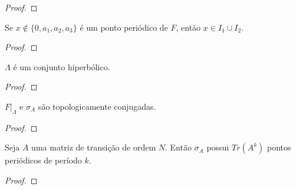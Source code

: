 \begin{proof}

\end{proof}


\begin{proposition}
Se $x \notin \{ 0, a_1, a_2, a_3 \}$ é um ponto periódico de $F$, então $x \in I_1 \cup I_2$.
\end{proposition}


\begin{proof}

\end{proof}


\begin{lemma}
$\Lambda$ é um conjunto hiperbólico.
\end{lemma}


\begin{proof}

\end{proof}


\begin{theorem}
$F|_\Lambda$ e $\sigma_A$ são topologicamente conjugadas.
\end{theorem}


\begin{proof}

\end{proof}


\begin{proposition}
Seja $A$ uma matriz de transição de ordem $N$. Então $\sigma_A$ possui $Tr(A^k)$ pontos periódicos de período $k$.
\end{proposition}


\begin{proof}

\end{proof}











